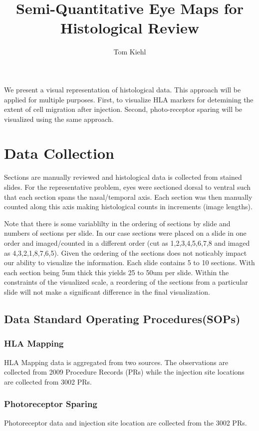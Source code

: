 \documentclass{article}
\title{Semi-Quantitative Eye Maps for Histological Review}
\author{Tom Kiehl}
\begin{document}

\maketitle{}



\abstract{}
We present a visual representation of histological data. This approach will be applied for multiple purposes. First, to visualize HLA markers for detemining the extent of cell migration after injection. Second, photo-receptor sparing will be visualized using the same approach.


\section{Data Collection}
Sections are manually reviewed and histological data is collected from stained slides. For the representative problem, eyes were sectioned dorsal to ventral such that each section spans the nasal/temporal axis. Each section was then manually counted along this axis making histological counts in increments (image lengths).

Note that there is some variablilty in the ordering of sections by slide and numbers of sections per slide. In our case sections were placed on a slide in one order and imaged/counted in a different order (cut as 1,2,3,4,5,6,7,8 and imaged as 4,3,2,1,8,7,6,5). Given the ordering of the sections does not noticably impact our ability to visualize the information. Each slide contains 5 to 10 sections. With each section being 5um thick this yields 25 to 50um per slide. Within the constraints of the visualized scale, a reordering of the sections from a particular slide will not make a significant difference in the final visualization.

\subsection{Data Standard Operating Procedures(SOPs)}
\subsubsection{HLA Mapping}
HLA Mapping data is aggregated from two sources. The observations are collected from 2009 Procedure Records (PRs) while the injection site locations are collected from 3002 PRs.
\subsubsection{Photoreceptor Sparing}
Photoreceptor data and injection site location are collected from the 3002 PRs.
\end{document}
